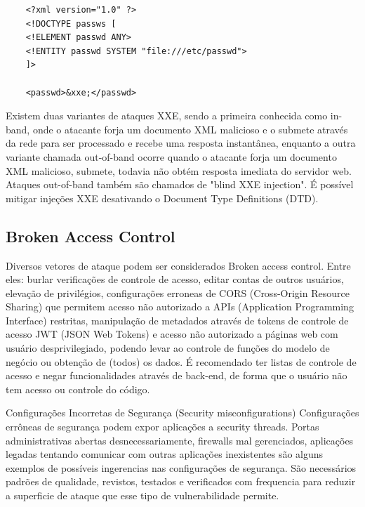 \begin{verbatim}
    <?xml version="1.0" ?>
    <!DOCTYPE passws [
    <!ELEMENT passwd ANY>
    <!ENTITY passwd SYSTEM "file:///etc/passwd">
    ]>

    <passwd>&xxe;</passwd>
\end{verbatim}

Existem duas variantes de ataques XXE, sendo a primeira conhecida como in-band, onde o atacante forja um documento XML malicioso e o submete através da rede para ser processado e recebe uma resposta instantânea, enquanto a outra variante chamada out-of-band ocorre quando o atacante forja um documento XML malicioso, submete, todavia não obtém resposta imediata do servidor web. Ataques out-of-band também são chamados de "blind XXE injection".
É possível mitigar injeções XXE desativando o Document Type Definitions (DTD). 

\subsection{Broken Access Control}
Diversos vetores de ataque podem ser considerados Broken access control. Entre eles: burlar verificações de controle de acesso, editar contas de outros usuários, elevação de privilégios, configurações erroneas de CORS (Cross-Origin Resource Sharing) que permitem acesso não autorizado a APIs (Application Programming Interface) restritas, manipulação de metadados através de tokens de controle de acesso JWT (JSON Web Tokens) e acesso não autorizado a páginas web com usuário desprivilegiado, podendo levar ao controle de funções do modelo de negócio ou obtenção de (todos) os dados.
É recomendado ter listas de controle de acesso e negar funcionalidades através de back-end, de forma que o usuário não tem acesso ou controle do código.

Configurações Incorretas de Segurança (Security misconfigurations)
Configurações errôneas de segurança podem expor aplicações a security threads. Portas administrativas abertas desnecessariamente, firewalls mal gerenciados, aplicações legadas tentando comunicar com outras aplicações inexistentes são alguns exemplos de possíveis ingerencias nas configurações de segurança. São necessários padrões de qualidade, revistos, testados e verificados com frequencia para reduzir a superficie de ataque que esse tipo de vulnerabilidade permite.

